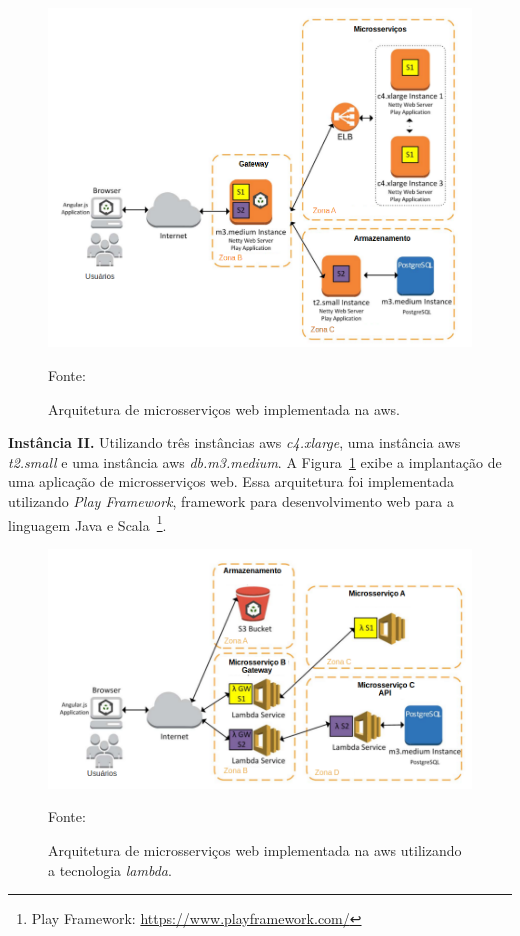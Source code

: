 \begin{figure}[htb!]
\caption{Arquitetura de microsserviços web implementada na \ac{aws}.}
\label{fig:aws_microsservicos}
\includegraphics[width=\textwidth]{img/cap2/aws_microsservicos.png}
\centering

Fonte:~\cite{7515686}
\end{figure}

\textbf{Instância II.} Utilizando três instâncias \ac{aws} \textit{c4.xlarge}, uma instância \ac{aws} \textit{t2.small} e uma instância \ac{aws} \textit{db.m3.medium}.
%
A Figura~\ref{fig:aws_microsservicos} exibe a implantação de uma aplicação de microsserviços web. Essa arquitetura foi implementada utilizando \textit{Play Framework}, framework para desenvolvimento web para a linguagem Java e Scala~\footnote{Play Framework: \url{https://www.playframework.com/}}.



\begin{figure}[htb!]
\caption{Arquitetura de microsserviços web implementada na \ac{aws} utilizando a tecnologia \textit{lambda}.}
\label{fig:aws_lambda}
\includegraphics[width=\textwidth]{img/cap2/aws_lambda.png}
\centering

Fonte:~\cite{7515686}
\end{figure}

